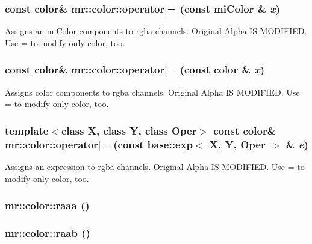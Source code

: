 \subsubsection{\setlength{\rightskip}{0pt plus 5cm}const {\bf color}\& mr::color::operator$|$= (const mi\-Color \& {\em x})\hspace{0.3cm}{\tt  [inline]}}\label{structmr_1_1color_z4_2}


Assigns an mi\-Color components to rgba channels. Original Alpha IS MODIFIED. Use = to modify only color, too. 
\subsubsection{\setlength{\rightskip}{0pt plus 5cm}const {\bf color}\& mr::color::operator$|$= (const {\bf color} \& {\em x})\hspace{0.3cm}{\tt  [inline]}}\label{structmr_1_1color_z4_1}


Assigns color components to rgba channels. Original Alpha IS MODIFIED. Use = to modify only color, too. 
\subsubsection{\setlength{\rightskip}{0pt plus 5cm}template$<$class X, class Y, class Oper$>$ const {\bf color}\& mr::color::operator$|$= (const {\bf base::exp}$<$ X, Y, Oper $>$ \& {\em e})\hspace{0.3cm}{\tt  [inline]}}\label{structmr_1_1color_z4_0}


Assigns an expression to rgba channels. Original Alpha IS MODIFIED. Use = to modify only color, too. 
\subsubsection{ mr::color::raaa ()\hspace{0.3cm}{\tt  [inline]}}\label{structmr_1_1color_z7_230}


\subsubsection{ mr::color::raab ()\hspace{0.3cm}{\tt  [inline]}}\label{structmr_1_1color_z7_212}


